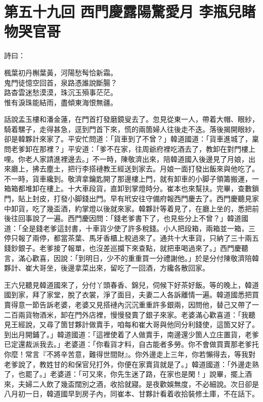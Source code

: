 
\chapter*{第五十九回 西門慶露陽驚愛月 李瓶兒睹物哭官哥}


詩曰：

\begin{myquote} 
楓葉初丹槲葉黃，河陽愁髩恰新霜。\\鬼門徒憶空回首，泉路憑誰說斷腸？\\路杳雲迷愁漠漠，珠沉玉殞事茫茫。\\惟有淚珠能結雨，盡傾東海恨無疆。
\end{myquote} 

話說孟玉樓和潘金蓮，在門首打發磨鏡叟去了。忽見從東一人，帶着大帽、眼紗，騎着騾子，走得甚急，逕到門首下來，慌的兩箇婦人往後走不迭。落後揭開眼紗，卻是韓夥計來家了。平安忙問道：「貨車到了不曾？」韓道國道：「貨車進城了，稟問老爹卸在那裡？」平安道：「爹不在家，往周爺府裡吃酒去了，教卸在對門樓上哩。你老人家請進裡邊去。」不一時，陳敬濟出來，陪韓道國入後邊見了月娘，出來廳上，拂去塵土，把行李搭褳教王經送到家去。月娘一面打發出飯來與他吃了。不一時，貨車纔到。敬濟拿鑰匙開了那邊樓上門，就有卸車的小脚子領籌搬運，一箱箱都堆卸在樓上。十大車段貨，直卸到掌燈時分。崔本也來幫扶。完畢，查數鎖門，貼上封皮，打發小脚錢出門。早有玳安往守備府報西門慶去了。西門慶聽見家中卸貨，吃了幾盃酒，約掌燈以後就來家。韓夥計等着見了，在廳上坐的，悉把前後往回事說了一遍。西門慶因問：「錢老爹書下了，也見些分上不曾？」韓道國道：「全是錢老爹這封書，十車貨少使了許多稅錢。小人把段箱，兩箱並一箱，三停只報了兩停，都當茶葉、馬牙香櫃上稅過來了。通共十大車貨，只納了三十兩五錢鈔銀子。老爹接了報單，也沒差巡攔下來查點，就把車喝過來了。」西門慶聽言，滿心歡喜，{}因說：「到明日，少不的重重買一分禮謝他。」於是分付陳敬濟陪韓夥計、崔大哥坐，後邊拿菜出來，留吃了一回酒，方纔各散回家。

王六兒聽見韓道國來了，分付丫頭春香、錦兒，伺候下好茶好飯。等的晚上，韓道國到家，拜了家堂，脫了衣裳，淨了面目，夫妻二人各訴離情一遍。韓道國悉把買賣得意一節告訴老婆，老婆又見搭褳內沉沉重重許多銀兩，因問他，替己又帶了一二百兩貨物酒米，卸在門外店裡，慢慢發賣了銀子來家。老婆滿心歡喜道：「我聽見王經說，又尋了箇甘夥計做賣手，咱每和崔大哥與他同分利錢使，這箇又好了。到出月開鋪了。」韓道國道：「這裡使着了人做賣手，南邊還少箇人立庄置貨，老爹已定還裁派我去。」老婆道：「你看貨才料，自古能者多勞。你不會做買賣那老爹托你麼！常言『不將辛苦意，難得世間財』。你外邊走上三年，你若懶得去，等我對老爹說了，教姓甘的和保官兒打外，你便在家賣貨就是了。」韓道國道：「外邊走熟了，也罷了。」老婆道：「可又來，你先生迷了路，在家也是閑！」說畢，擺上酒來，夫婦二人飲了幾盃闊別之酒，收拾就寢。是夜歡娛無度，不必細說。次日卻是八月初一日，韓道國早到房子內，同崔本、甘夥計看着收拾裝修土庫，不在話下。

